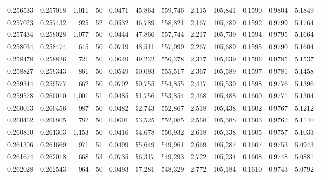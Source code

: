 \begin{tabular}{rrrrrrrrrrrrr}
0.256533 & 0.257018 & 1,011 &  50 &                                     0.0471 &  45,864 & 559,746 &   2,115 & 105,841 & 0.1590 & 0.9804 & 5.1849 \\
0.257023 & 0.257432 &   925 &  52 &                                     0.0532 &  46,789 & 558,821 &   2,167 & 105,789 & 0.1592 & 0.9799 & 5.1764 \\
0.257434 & 0.258028 & 1,077 &  50 &                                     0.0444 &  47,866 & 557,744 &   2,217 & 105,739 & 0.1594 & 0.9795 & 5.1664 \\
0.258034 & 0.258474 &   645 &  50 &                                     0.0719 &  48,511 & 557,099 &   2,267 & 105,689 & 0.1595 & 0.9790 & 5.1604 \\
0.258478 & 0.258826 &   721 &  50 &                                     0.0649 &  49,232 & 556,378 &   2,317 & 105,639 & 0.1596 & 0.9785 & 5.1537 \\
0.258827 & 0.259343 &   861 &  50 &                                     0.0549 &  50,093 & 555,517 &   2,367 & 105,589 & 0.1597 & 0.9781 & 5.1458 \\
0.259344 & 0.259577 &   662 &  50 &                                     0.0702 &  50,755 & 554,855 &   2,417 & 105,539 & 0.1598 & 0.9776 & 5.1396 \\
0.259578 & 0.260010 & 1,001 &  51 &                                     0.0485 &  51,756 & 553,854 &   2,468 & 105,488 & 0.1600 & 0.9771 & 5.1304 \\
0.260013 & 0.260456 &   987 &  50 &                                     0.0482 &  52,743 & 552,867 &   2,518 & 105,438 & 0.1602 & 0.9767 & 5.1212 \\
0.260462 & 0.260805 &   782 &  50 &                                     0.0601 &  53,525 & 552,085 &   2,568 & 105,388 & 0.1603 & 0.9762 & 5.1140 \\
0.260810 & 0.261303 & 1,153 &  50 &                                     0.0416 &  54,678 & 550,932 &   2,618 & 105,338 & 0.1605 & 0.9757 & 5.1033 \\
0.261306 & 0.261669 &   971 &  51 &                                     0.0499 &  55,649 & 549,961 &   2,669 & 105,287 & 0.1607 & 0.9753 & 5.0943 \\
0.261674 & 0.262018 &   668 &  53 &                                     0.0735 &  56,317 & 549,293 &   2,722 & 105,234 & 0.1608 & 0.9748 & 5.0881 \\
0.262028 & 0.262543 &   964 &  50 &                                     0.0493 &  57,281 & 548,329 &   2,772 & 105,184 & 0.1610 & 0.9743 & 5.0792 \\

\end{tabular}

